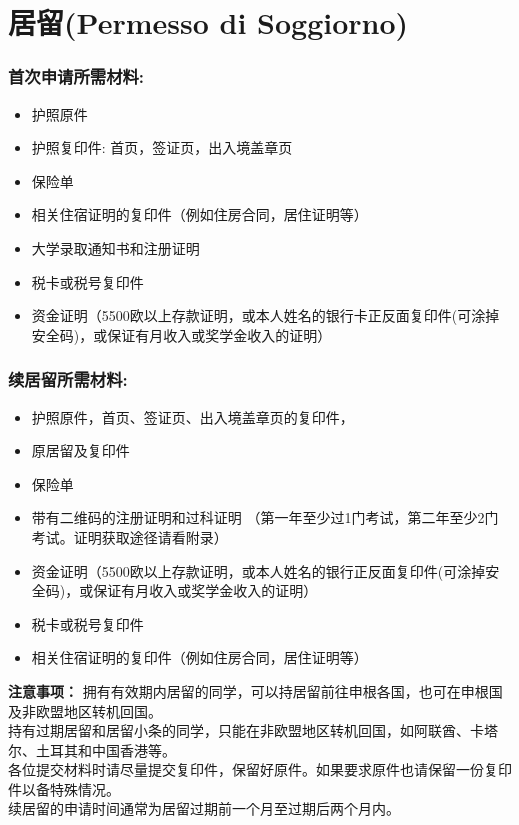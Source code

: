 \section{居留(Permesso di Soggiorno)}
\subsubsection{首次申请所需材料:}
\begin{itemize} 
\item 护照原件
\item 护照复印件: 首页，签证页，出入境盖章页
\item 保险单 
\item 相关住宿证明的复印件（例如住房合同，居住证明等）
\item 大学录取通知书和注册证明
\item 税卡或税号复印件
\item 资金证明（5500欧以上存款证明，或本人姓名的银行卡正反面复印件(可涂掉安全码)，或保证有月收入或奖学金收入的证明）
\end{itemize}

\subsubsection{续居留所需材料:}
\begin{itemize} 
\item 护照原件，首页、签证页、出入境盖章页的复印件，
\item 原居留及复印件
\item 保险单
\item 带有二维码的注册证明和过科证明  （第一年至少过1门考试，第二年至少2门考试。证明获取途径请看附录）
\item 资金证明（5500欧以上存款证明，或本人姓名的银行正反面复印件(可涂掉安全码)，或保证有月收入或奖学金收入的证明）
\item 税卡或税号复印件
\item 相关住宿证明的复印件（例如住房合同，居住证明等）
\end{itemize}
\textbf{注意事项：}
拥有有效期内居留的同学，可以持居留前往申根各国，也可在申根国及非欧盟地区转机回国。\\
持有过期居留和居留小条的同学，只能在非欧盟地区转机回国，如阿联酋、卡塔尔、土耳其和中国香港等。\\
各位提交材料时请尽量提交复印件，保留好原件。如果要求原件也请保留一份复印件以备特殊情况。\\

续居留的申请时间通常为居留过期前一个月至过期后两个月内。 

